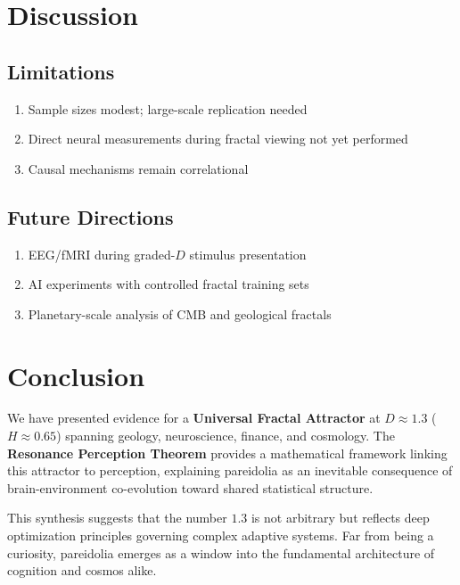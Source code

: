 \documentclass[11pt,a4paper]{article}
\begin{document}
\section{Discussion}

\subsection{Limitations}
\begin{enumerate}
    \item Sample sizes modest; large-scale replication needed
    \item Direct neural measurements during fractal viewing not yet performed
    \item Causal mechanisms remain correlational
\end{enumerate}

\subsection{Future Directions}
\begin{enumerate}
    \item EEG/fMRI during graded-$D$ stimulus presentation
    \item AI experiments with controlled fractal training sets
    \item Planetary-scale analysis of CMB and geological fractals
\end{enumerate}

\section{Conclusion}

We have presented evidence for a \textbf{Universal Fractal Attractor} at $D \approx 1.3$ ($H \approx 0.65$) spanning geology, neuroscience, finance, and cosmology. The \textbf{Resonance Perception Theorem} provides a mathematical framework linking this attractor to perception, explaining pareidolia as an inevitable consequence of brain-environment co-evolution toward shared statistical structure.

This synthesis suggests that the number $1.3$ is not arbitrary but reflects deep optimization principles governing complex adaptive systems. Far from being a curiosity, pareidolia emerges as a window into the fundamental architecture of cognition and cosmos alike.
\end{document}
